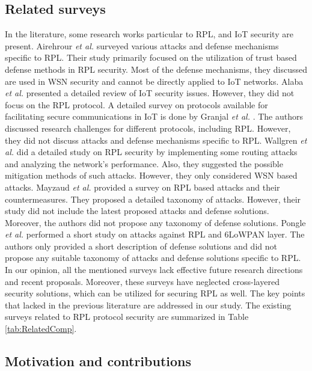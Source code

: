 \documentclass[10pt,journal,sort & compress]{IEEEtran}
\begin{document}
\subsection{Related surveys}
In the literature, some research works particular to RPL, and IoT security are present. Airehrour \textit{et al.} \cite{airehrour2016secure} surveyed various attacks and defense mechanisms specific to RPL. Their study primarily focused on the utilization of trust based defense methods in RPL security. Most of the defense mechanisms, they discussed are used in WSN security and cannot be directly applied to IoT networks. Alaba \textit{et al.} \cite{Alaba2017} presented a detailed review of IoT security issues. However, they did not focus on the RPL protocol. A detailed survey on protocols available for facilitating secure communications in IoT is done by Granjal \textit{et al.} \cite{Granjal}. The authors discussed research challenges for different protocols, including RPL. However, they did not discuss attacks and defense mechanisms specific to RPL. Wallgren \textit{et al.} \cite{wallgren2013routing} did a detailed study on RPL security by implementing some routing attacks and analyzing the network's performance. Also, they suggested the possible mitigation methods of such attacks. However, they only considered WSN based attacks. Mayzaud \textit{et al.} \cite{Mayzaud2016Taxanomy} provided a survey on RPL based attacks and their countermeasures. They proposed a detailed taxonomy of attacks. However, their study did not include the latest proposed attacks and defense solutions. Moreover, the authors did not propose any taxonomy of defense solutions. Pongle \textit{et al.} \cite{pongle2015real} performed a short study on attacks against RPL and $ 6 $LoWPAN layer. The authors only provided a short description of defense solutions and did not propose any suitable taxonomy of attacks and defense solutions specific to RPL. In our opinion, all the mentioned surveys lack effective future research directions and recent proposals. Moreover, these surveys have neglected cross-layered security solutions, which can be utilized for securing RPL as well. The key points that lacked in the previous literature are addressed in our study. The existing surveys related to RPL protocol security are summarized in Table \ref{tab:RelatedComp}.   


\subsection{Motivation and contributions}
\end{document}
